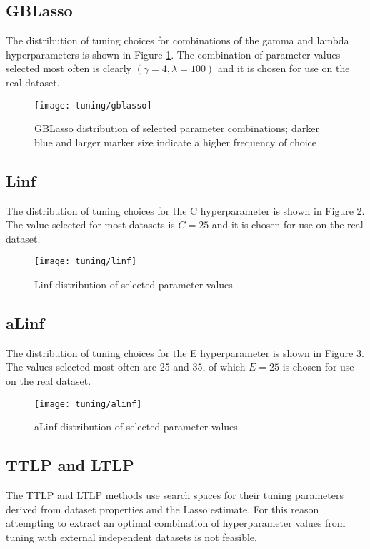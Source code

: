 \pagebreak

\subsection{GBLasso}
The distribution of tuning choices for combinations of the gamma and lambda hyperparameters is shown in Figure \ref{fig:tun_gblasso}. The combination of parameter values selected most often is clearly $(\gamma = 4, \lambda=100)$ and it is chosen for use on the real dataset.
\begin{figure}[H]
	\centering
	\texttt{[image: tuning/gblasso]}
	\caption{GBLasso distribution of selected parameter combinations; darker blue and larger marker size indicate a higher frequency of choice}
	\label{fig:tun_gblasso}
\end{figure}

\pagebreak

\subsection{Linf}
The distribution of tuning choices for the C hyperparameter is shown in Figure \ref{fig:tun_linf}. The value selected for most datasets is $C = 25$ and it is chosen for use on the real dataset.
\begin{figure}[H]
	\centering
	\texttt{[image: tuning/linf]}
	\caption{Linf distribution of selected parameter values}
	\label{fig:tun_linf}
\end{figure}

\pagebreak

\subsection{aLinf}
The distribution of tuning choices for the E hyperparameter is shown in Figure \ref{fig:tun_alinf}. The values selected most often are 25 and 35, of which $E = 25$ is chosen for use on the real dataset.
\begin{figure}[H]
	\centering
	\texttt{[image: tuning/alinf]}
	\caption{aLinf distribution of selected parameter values}
	\label{fig:tun_alinf}
\end{figure}

\pagebreak

\subsection{TTLP and LTLP}
The TTLP and LTLP methods use search spaces for their tuning parameters derived from dataset properties and the Lasso estimate. For this reason attempting to extract an optimal combination of hyperparameter values from tuning with external independent datasets is not feasible. 

